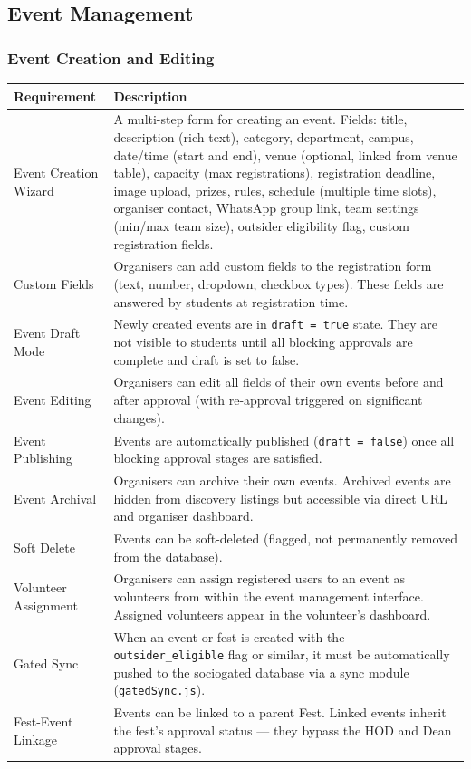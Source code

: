 \documentclass[12pt,a4paper]{article}
\begin{document}
\subsection{Event Management}

\subsubsection{Event Creation and Editing}

\begin{tabularx}{\textwidth}{L{4cm} X}
\toprule
{}
\textbf{Requirement} & \textbf{Description} \\
\midrule
Event Creation Wizard & A multi-step form for creating an event. Fields: title, description (rich text), category, department, campus, date/time (start and end), venue (optional, linked from venue table), capacity (max registrations), registration deadline, image upload, prizes, rules, schedule (multiple time slots), organiser contact, WhatsApp group link, team settings (min/max team size), outsider eligibility flag, custom registration fields. \\
Custom Fields & Organisers can add custom fields to the registration form (text, number, dropdown, checkbox types). These fields are answered by students at registration time. \\
Event Draft Mode & Newly created events are in \texttt{draft = true} state. They are not visible to students until all blocking approvals are complete and draft is set to false. \\
Event Editing & Organisers can edit all fields of their own events before and after approval (with re-approval triggered on significant changes). \\
Event Publishing & Events are automatically published (\texttt{draft = false}) once all blocking approval stages are satisfied. \\
Event Archival & Organisers can archive their own events. Archived events are hidden from discovery listings but accessible via direct URL and organiser dashboard. \\
Soft Delete & Events can be soft-deleted (flagged, not permanently removed from the database). \\
Volunteer Assignment & Organisers can assign registered users to an event as volunteers from within the event management interface. Assigned volunteers appear in the volunteer's dashboard. \\
Gated Sync & When an event or fest is created with the \texttt{outsider\_eligible} flag or similar, it must be automatically pushed to the sociogated database via a sync module (\texttt{gatedSync.js}). \\
Fest-Event Linkage & Events can be linked to a parent Fest. Linked events inherit the fest's approval status — they bypass the HOD and Dean approval stages. \\
\bottomrule
\end{tabularx}
\end{document}
